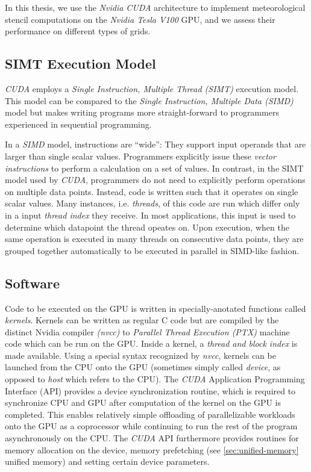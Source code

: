 In this thesis, we use the \emph{Nvidia CUDA} architecture to implement meteorological stencil computations on the \emph{Nvidia Tesla V100} GPU, and we assess their performance on different types of grids.

\subsection{SIMT Execution Model}

\emph{CUDA} employs a \emph{Single Instruction, Multiple Thread (SIMT)} execution model. This model can be compared to the \emph{Single Instruction, Multiple Data (SIMD)} model but makes writing programs more straight-forward to programmers experienced in sequential programming.\cite[Section~3.1]{ptx-isa} 

In a \emph{SIMD} model, instructions are ``wide'': They support input operands that are larger than single scalar values. Programmers explicitly issue these \emph{vector instructions} to perform a calculation on a set of values. In contrast, in the SIMT model used by \emph{CUDA}, programmers do not need to explicitly perform operations on multiple data points. Instead, code is written such that it operates on single scalar values. Many instances, i.e. \emph{threads}, of this code are run which differ only in a input \emph{thread index} they receive. In most applications, this input is used to determine which datapoint the thread opeates on. Upon execution, when the same operation is executed in many threads on consecutive data points, they are grouped together automatically to be executed in parallel in SIMD-like fashion.

\subsection{Software}

Code to be executed on the GPU is written in specially-anotated functions called \emph{kernels}. Kernels can be written as regular C code but are compiled by the distinct Nvidia compiler \emph{(nvcc)} to \emph{Parallel Thread Execution (PTX)} machine code which can be run on the GPU. Inside a kernel, a \emph{thread and block index} is made available. Using a special syntax recognized by \emph{nvcc}, kernels can be launched from the CPU onto the GPU (sometimes simply called \emph{device}, as opposed to \emph{host} which refers to the CPU). The \emph{CUDA} Application Programming Interface (API) provides a device synchronization routine, which is required to synchronize CPU and GPU after computation of the kernel on the GPU is completed. This enables relatively simple offloading of parallelizable workloads onto the GPU as a coprocessor while continuing to run the rest of the program asynchronously on the CPU. The \emph{CUDA} API furthermore provides routines for memory allocation on the device, memory prefetching (see \ref{sec:unified-memory} unified memory) and setting certain device parameters.

